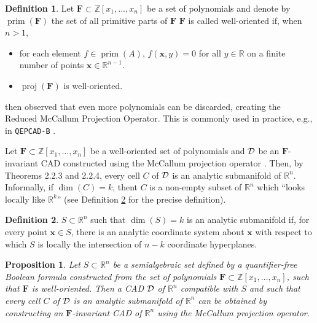 \documentclass[
]{book}
\newtheorem{proposition}{Proposition}[chapter]
\theoremstyle{definition}
\newtheorem{definition}{Definition}[chapter]
\theoremstyle{definition}
\theoremstyle{definition}
\theoremstyle{definition}
\theoremstyle{remark}
\begin{document}
\begin{definition}

\citep[6.1]{mccallum1998}
Let \(\mathbf{F} \subset \mathbb{Z}[x_1, \ldots, x_n]\) be a set of polynomials and denote by \(\operatorname{prim}(\mathbf{F})\) the set of all primitive parts of \(\mathbf{F}\)
\(\mathbf{F}\) is called well-oriented if, when \(n > 1\),

\begin{itemize}
\item
  for each element \(f \in \operatorname{prim}(A)\), \(f(\mathbf{x},y) = 0\) for all \(y\in \mathbb{R}\) on a finite number of points \(\mathbf{x} \in \mathbb{R}^{n-1}\). \citep[condition WO1]{mccallum1998}
\item
  \(\operatorname{proj}(\mathbf{F})\) is well-oriented. \citep[condition WO2]{mccallum1998}
\end{itemize}

\end{definition}

\citet{brown2001} then observed that even more polynomials can be discarded, creating the Reduced McCallum Projection Operator. This is commonly used in practice, e.g., in \texttt{QEPCAD-B} \citep{brownQepcad}.

Let \(\mathbf{F} \subset \mathbb{Z}[x_1,\ldots,x_n]\) be a well-oriented set of polynomials and \(\cal D\) be an \(\mathbf{F}\)-invariant CAD constructed using the McCallum projection operator \citep{mccallum1998}. Then, by \citet{mccallum1988} Theorems 2.2.3 and 2.2.4, every cell \(C\) of \(\cal D\) is an analytic submanifold of \(\mathbb{R}^n\). Informally, if \(\dim(C) = k\), thent \(C\) is a non-empty subset of \(\mathbb{R}^n\) which ``looks locally like \(\mathbb{R}^k\)'' (see Definition \ref{def:analytic-submanifold} for the precise definition).

\begin{definition}
\protect\hypertarget{def:analytic-submanifold}{}\label{def:analytic-submanifold}\(S \subset \mathbb{R}^n\) such that \(\dim(S) = k\) is an analytic submanifold if, for every point \(\mathbf{x} \in S\), there is an analytic coordinate system about \(\mathbf{x}\) with respect to which \(S\) is locally the intersection of \(n-k\) coordinate hyperplanes.
\end{definition}

\begin{proposition}
\protect\hypertarget{prp:mc-smooth}{}\label{prp:mc-smooth}Let \(S \subset \mathbb{R}^n\) be a semialgebraic set defined by a quantifier-free Boolean formula constructed from the set of polynomials \(\mathbf{F} \subset \mathbb{Z}[x_1,\ldots,x_n]\), such that \(\mathbf{F}\) is well-oriented.
Then a CAD \(\cal D\) of \(\mathbb{R}^n\) compatible with \(S\) and such that every cell \(C\) of \(\cal D\) is an analytic submanifold of \(\mathbb{R}^n\) can be obtained by constructing an \(\mathbf{F}\)-invariant CAD of \(\mathbb{R}^n\) using the McCallum projection operator.
\end{proposition}
\end{document}
